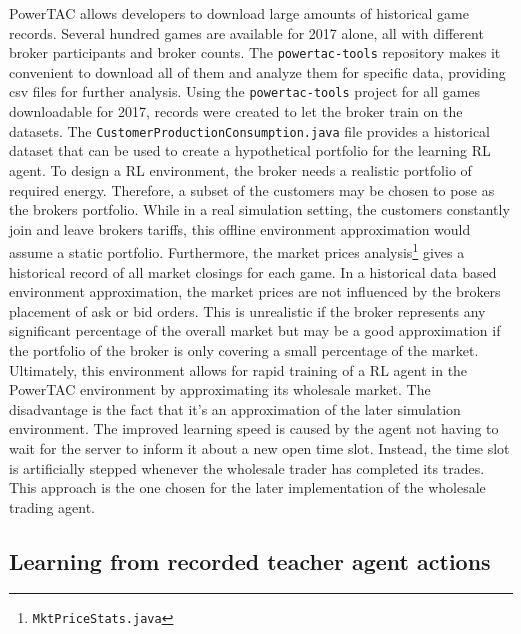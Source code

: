 \ac{PowerTAC} allows developers to download large amounts of historical game records. Several hundred games are
available for 2017 alone, all with different broker participants and broker counts. The \texttt{powertac-tools}
repository makes it convenient to download all  of them and analyze them for specific data, providing csv files for
further analysis. Using the \texttt{powertac-tools} project for all games downloadable for 2017, records were created to
let the broker train on the datasets. The \texttt{CustomerProductionConsumption.java} file
provides a historical dataset that can be used to create a hypothetical portfolio for the learning \ac{RL} agent. To design a \ac{RL}
environment, the broker needs a realistic portfolio of required energy. Therefore, a subset of the customers may be
chosen to pose as the brokers portfolio. While in a real simulation setting, the customers constantly join and leave
brokers tariffs, this offline environment approximation would assume a static portfolio. Furthermore, the market prices
analysis\footnote{\texttt{MktPriceStats.java}} gives a historical record of all market closings for each game. In a
historical data based environment approximation, the market prices are not influenced by the brokers placement of ask
or bid orders. This is unrealistic if the broker represents any significant percentage of the overall market but may be
a good approximation if the portfolio of the broker is only covering a small percentage of the market. Ultimately, this
environment allows for rapid training of a \ac{RL} agent in the \ac{PowerTAC} environment by approximating its wholesale
market. The disadvantage is the fact that it's an approximation of the later simulation environment. The improved learning speed
is caused by the agent not having to wait for the server to inform it about a new open time slot. Instead, the
time slot is artificially stepped whenever the wholesale trader has completed its trades. This approach is the one
chosen for the later implementation of the wholesale trading agent.

\subsection{Learning from recorded teacher agent actions}%
\label{ssub:learning_from_historical_actions_of_teacher_agents}

